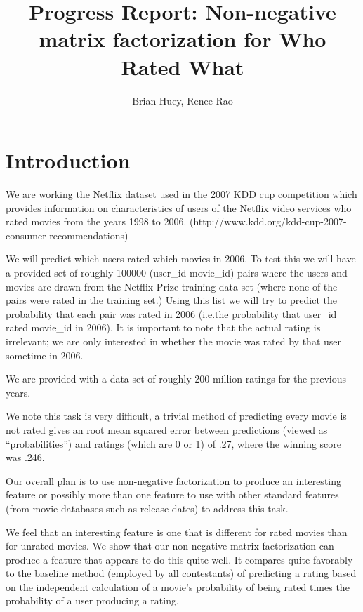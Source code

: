 \documentclass[11pt]{article}
\title{Progress Report: Non-negative matrix factorization for Who Rated What}
\author{ Brian Huey, Renee Rao }
\date{}
\begin{document}
\maketitle

\begin{abstract}

\end{abstract}

\section{Introduction}

We are working the Netflix dataset used in the 2007 KDD cup
competition which provides information on characteristics of users of
the Netflix video services who rated movies from the years 1998 to
2006. (http://www.kdd.org/kdd-cup-2007-consumer-recommendations)

We will predict which users rated which movies in 2006. To
test this we will have a provided set of roughly 100000 (user\_id
movie\_id) pairs where the users and movies are drawn from the Netflix
Prize training data set (where none of the pairs were rated in the
training set.) Using this list we will try to predict the probability
that each pair was rated in 2006 (i.e.the probability that user\_id
rated movie\_id in 2006). It is important to note that the actual
rating is irrelevant; we are only interested in whether the movie was
rated by that user sometime in 2006.  

We are provided with a data set of roughly 200 million ratings
for the previous years.

We note this task is very difficult, a trivial method
of predicting every movie is not rated gives
an root mean squared error between predictions (viewed as ``probabilities'')
and ratings (which are 0 or 1) of .27, where the winning
score was .246.

Our overall plan is to use non-negative factorization
to produce an interesting feature or possibly
more than one feature to use with other standard
features (from movie databases such as release
dates) to address this task.

We feel that an interesting feature is one that is different
for rated movies than for unrated movies.  We show
that our non-negative matrix factorization can 
produce a feature that appears to do this quite
well.  It compares quite favorably to the 
baseline method (employed by all contestants)
of predicting a rating based on the independent
calculation of a movie's probability of being
rated times the probability of a user producing
a rating.  
\end{document}
